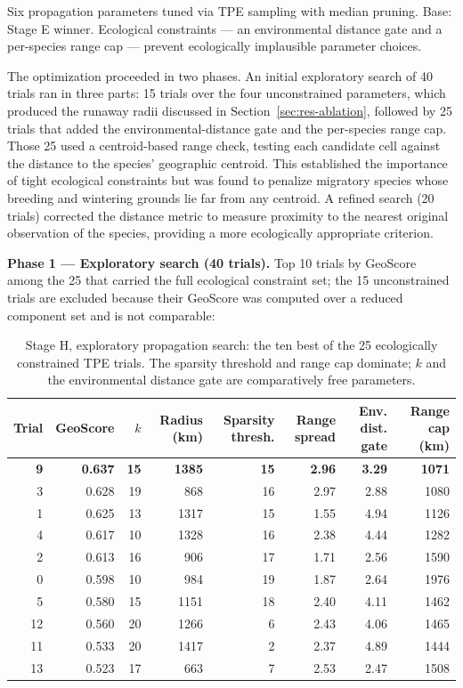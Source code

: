 Six propagation parameters tuned via TPE sampling with median pruning. Base: Stage E winner. Ecological constraints --- an environmental distance gate and a per-species range cap --- prevent ecologically implausible parameter choices.

The optimization proceeded in two phases. An initial exploratory search of 40 trials ran in three parts: 15 trials over the four unconstrained parameters, which produced the runaway radii discussed in Section~\ref{sec:res-ablation}, followed by 25 trials that added the environmental-distance gate and the per-species range cap. Those 25 used a centroid-based range check, testing each candidate cell against the distance to the species' geographic centroid. This established the importance of tight ecological constraints but was found to penalize migratory species whose breeding and wintering grounds lie far from any centroid. A refined search (20 trials) corrected the distance metric to measure proximity to the nearest original observation of the species, providing a more ecologically appropriate criterion.

\textbf{Phase 1 --- Exploratory search (40 trials).} Top 10 trials by GeoScore among the 25 that carried the full ecological constraint set; the 15 unconstrained trials are excluded because their GeoScore was computed over a reduced component set and is not comparable:

\begin{table}[H]
\centering
\caption{Stage H, exploratory propagation search: the ten best of the 25 ecologically constrained TPE trials. The sparsity threshold and range cap dominate; $k$ and the environmental distance gate are comparatively free parameters.}
\label{tab:stage-h1}
\small
\begin{tabular}{rrrrrrrr}
\toprule
Trial & GeoScore & $k$ & Radius (km) & Sparsity thresh. & Range spread & Env. dist. gate & Range cap (km) \\
\midrule
\textbf{9} & \textbf{0.637} & \textbf{15} & \textbf{1385} & \textbf{15} & \textbf{2.96} & \textbf{3.29} & \textbf{1071} \\
3 & 0.628 & 19 & 868 & 16 & 2.97 & 2.88 & 1080 \\
1 & 0.625 & 13 & 1317 & 15 & 1.55 & 4.94 & 1126 \\
4 & 0.617 & 10 & 1328 & 16 & 2.38 & 4.44 & 1282 \\
2 & 0.613 & 16 & 906 & 17 & 1.71 & 2.56 & 1590 \\
0 & 0.598 & 10 & 984 & 19 & 1.87 & 2.64 & 1976 \\
5 & 0.580 & 15 & 1151 & 18 & 2.40 & 4.11 & 1462 \\
12 & 0.560 & 20 & 1266 & 6 & 2.43 & 4.06 & 1465 \\
11 & 0.533 & 20 & 1417 & 2 & 2.37 & 4.89 & 1444 \\
13 & 0.523 & 17 & 663 & 7 & 2.53 & 2.47 & 1508 \\
\bottomrule
\end{tabular}
\end{table}

